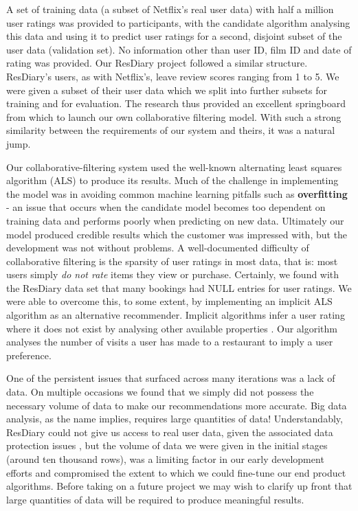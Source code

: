 \documentclass{l3proj}
\begin{document}
A set of training data (a subset of Netflix's real user data) with half a million user ratings was provided to participants, with the candidate algorithm analysing this data and using it to predict user ratings for a second, disjoint subset of the user data (validation set). No information other than user ID, film ID and date of rating was provided. Our ResDiary project followed a similar structure. ResDiary's users, as with Netflix's, leave review scores ranging from 1 to 5. We were given a subset of their user data which we split into further subsets for training and for evaluation. The research thus provided an excellent springboard from which to launch our own collaborative filtering model. With such a strong similarity between the requirements of our system and theirs, it was a natural jump.

Our collaborative-filtering system used the well-known alternating least squares algorithm (ALS) \cite{ALS} to produce its results. Much of the challenge in implementing the model was in avoiding common machine learning pitfalls such as \textbf{overfitting} - an issue that occurs when the candidate model becomes too dependent on training data and performs poorly when predicting on new data. Ultimately our model produced credible results which the customer was impressed with, but the development was not without problems. A well-documented \cite{CollabFilter} difficulty of collaborative filtering is the sparsity of user ratings in most data, that is: most users simply \textit{do not rate} items they view or purchase. Certainly, we found with the ResDiary data set that many bookings had NULL entries for user ratings. We were able to overcome this, to some extent, by implementing an implicit ALS algorithm as an alternative recommender. Implicit algorithms infer a user rating where it does not exist by analysing other available properties \cite{ImplicitALS}. Our algorithm analyses the number of visits a user has made to a restaurant to imply a user preference.

One of the persistent issues that surfaced across many iterations was a lack of data. On multiple occasions we found that we simply did not possess the necessary volume of data to make our recommendations more accurate. Big data analysis, as the name implies, requires large quantities of data! Understandably, ResDiary could not give us access to real user data, given the associated data protection issues \cite{DataProtection}, but the volume of data we were given in the initial stages (around ten thousand rows), was a limiting factor in our early development efforts and compromised the extent to which we could fine-tune our end product algorithms. Before taking on a future project we may wish to clarify up front that large quantities of data will be required to produce meaningful results.
\end{document}

